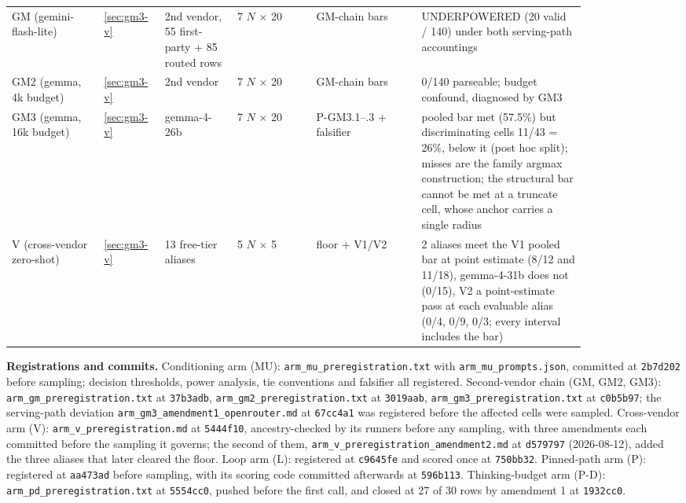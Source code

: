 \begin{small}
\begin{longtable}{@{}p{0.14\linewidth}p{0.07\linewidth}p{0.11\linewidth}p{0.12\linewidth}p{0.16\linewidth}p{0.25\linewidth}@{}}
GM (gemini-flash-lite) & \ref{sec:gm3-v} & 2nd vendor, 55 first-party + 85 routed rows & 7 $N$ $\times$ 20 & GM-chain bars & UNDERPOWERED (20 valid / 140) under both serving-path accountings \\
GM2 (gemma, 4k budget) & \ref{sec:gm3-v} & 2nd vendor & 7 $N$ $\times$ 20 & GM-chain bars & 0/140 parseable; budget confound, diagnosed by GM3 \\
GM3 (gemma, 16k budget) & \ref{sec:gm3-v} & gemma-4-26b & 7 $N$ $\times$ 20 & P-GM3.1--.3 + falsifier & pooled bar met (57.5\%) but discriminating cells 11/43 = 26\%, below it (post hoc split); misses are the family argmax construction; the structural bar cannot be met at a truncate cell, whose anchor carries a single radius \\
V (cross-vendor zero-shot) & \ref{sec:gm3-v} & 13 free-tier aliases & 5 $N$ $\times$ 5 & floor + V1/V2 & 2 aliases meet the V1 pooled bar at point estimate (8/12 and 11/18), gemma-4-31b does not (0/15), V2 a point-estimate pass at each evaluable alias (0/4, 0/9, 0/3; every interval includes the bar) \\
\bottomrule
\end{longtable}
\end{small}

\textbf{Registrations and commits.} Conditioning arm (MU): \texttt{arm\_mu\_preregistration.txt}
with \texttt{arm\_mu\_prompts.json}, committed at \texttt{2b7d202} before sampling; decision
thresholds, power analysis, tie conventions and falsifier all registered. Second-vendor chain
(GM, GM2, GM3): \texttt{arm\_gm\_preregistration.txt} at \texttt{37b3adb},
\texttt{arm\_gm2\_preregistration.txt} at \texttt{3019aab},
\texttt{arm\_gm3\_preregistration.txt} at \texttt{c0b5b97}; the serving-path deviation
\texttt{arm\_gm3\_amendment1\_openrouter.md} at \texttt{67cc4a1} was registered before the
affected cells were sampled. Cross-vendor arm (V): \texttt{arm\_v\_preregistration.md} at
\texttt{5444f10}, ancestry-checked by its runners before any sampling, with three amendments
each committed before the sampling it governs; the second of them,
\texttt{arm\_v\_\bk{}preregistration\_\bk{}amendment2.md} at \texttt{d579797} (2026-08-12),
added the three aliases that later cleared the floor. Loop arm (L): registered at \texttt{c9645fe}
and scored once at \texttt{750bb32}. Pinned-path arm (P): registered at \texttt{aa473ad}
before sampling, with its scoring code committed afterwards at \texttt{596b113}. Thinking-budget arm (P-D): \texttt{arm\_pd\_preregistration.txt} at
\texttt{5554cc0}, pushed before the first call, and closed at 27 of 30 rows by amendment 1 at
\texttt{1932cc0}.

